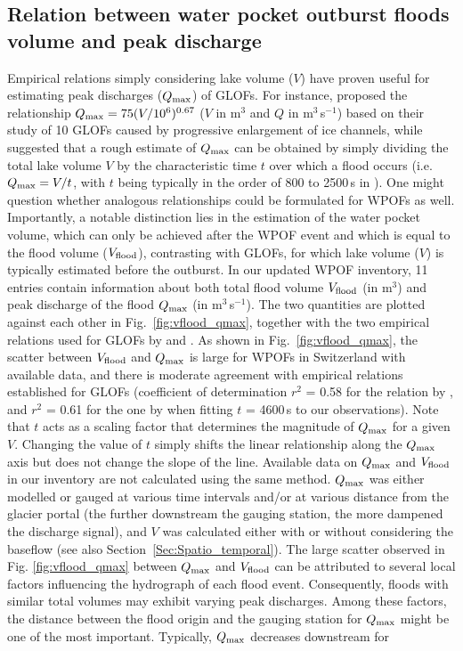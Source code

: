 \subsection{ Relation between water pocket outburst floods volume and peak discharge}
\label{sec:prediction}

Empirical relations simply considering lake volume ($V$) have proven useful for estimating peak discharges ($Q_{\rm{max}}$) of GLOFs. For instance, \citet{Clague&Mathews1973} proposed the relationship $Q_{\rm{max}} = 75(V/10^6)^{0.67}$ ($V$ in m$^3$ and $Q$ in m$^3$\,s$^{-1}$) based on their study of 10 GLOFs caused by progressive enlargement of ice channels, while \citet{Haeberli1983} suggested that a rough estimate of $Q_{\rm{max}}$ can be obtained by simply dividing the total lake volume $V$ by the characteristic time $t$ over which a flood occurs (i.e.\ $ Q_{\rm{max}} = V /t$, with $t$ being typically in the order of 800 to 2500\,s in \cite{Haeberli1983}). One might question whether analogous relationships could be formulated for WPOFs as well. Importantly, a notable distinction lies in the estimation of the water pocket volume, which can only be achieved after the WPOF event and which is equal to the flood volume ($V_{\rm{flood}}$), contrasting with GLOFs, for which lake volume ($V$) is typically estimated before the outburst. In our updated WPOF inventory, 11 entries contain information about both total flood volume $V_{\rm{flood}}$ (in m$^3$) and peak discharge of the flood $Q_{\rm{max}}$ (in m$^3$\,s$^{-1}$). The two quantities are plotted against each other in Fig.~\ref{fig:vflood_qmax}, together with the two empirical relations used for GLOFs by \citet{Clague&Mathews1973} and \citet{Haeberli1983}. As shown in Fig.~\ref{fig:vflood_qmax}, the scatter between $V_{\rm{flood}}$ and $Q_{\rm{max}}$ is large for WPOFs in Switzerland with available data, and there is moderate agreement with empirical relations established for GLOFs (coefficient of determination $r^2$ = 0.58 for the relation by \cite{Clague&Mathews1973}, and $r^2$ = 0.61 for the one by \cite{Haeberli1983} when fitting $t$ = 4600\,s to our observations). Note that $t$ acts as a scaling factor that determines the magnitude of $Q_{\rm{max}}$ for a given $V$. Changing the value of $t$ simply shifts the linear relationship along the $Q_{\rm{max}}$ axis but does not change the slope of the line. Available data on $Q_{\rm{max}}$ and $V_{\rm{flood}}$ in our inventory are not calculated using the same method. $Q_{\rm{max}}$ was either modelled or gauged at various time intervals and/or at various distance from the glacier portal (the further downstream the gauging station, the more dampened the discharge signal), and $V$ was calculated either with or without considering the baseflow (see also Section~\ref{Sec:Spatio_temporal}). The large scatter observed in Fig. \ref{fig:vflood_qmax} between $Q_{\rm{max}}$ and $V_{\rm{flood}}$ can be attributed to several local factors influencing the hydrograph of each flood event. Consequently, floods with similar total volumes may exhibit varying peak discharges. Among these factors, the distance between the flood origin and the gauging station for $Q_{\rm{max}}$ might be one of the most important. Typically, $Q_{\rm{max}}$ decreases downstream for 